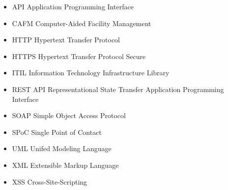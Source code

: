 \documentclass[fontsize=12pt]{scrartcl}
\begin{document}
\begin{itemize}[leftmargin=*] 
\item[] API \tabto{3cm} Application Programming Interface
\item[] CAFM \tabto{3cm} Computer-Aided Facility Management
\item[] HTTP \tabto{3cm} Hypertext Transfer Protocol
\item[] HTTPS \tabto{3cm} Hypertext Transfer Protocol Secure
\item[] ITIL \tabto{3cm} Information Technology Infrastructure Library
\item[] REST API \tabto{3cm} Representational State Transfer Application Programming Interface
\item[] SOAP \tabto{3cm} Simple Object Access Protocol
\item[] SPoC \tabto{3cm} Single Point of Contact
\item[] UML \tabto{3cm} Unifed Modeling Language
\item[] XML \tabto{3cm} Extensible Markup Language
\item[] XSS \tabto{3cm} Cross-Site-Scripting
\end{itemize}
\newpage

\vspace*{-1cm}
\begin{spacing}{1.8}
\listoftables
\end{spacing}
\newpage



\setcounter{page}{1}


\newpage 

\end{document}

